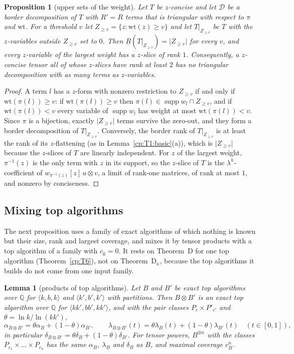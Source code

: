 \documentclass[11pt]{article}
\newtheorem{lemma}[theorem]{Lemma}
\newtheorem{proposition}[theorem]{Proposition}
\theoremstyle{definition}
\theoremstyle{remark}
\providecommand{\Q}{\mathbb{Q}}
\newcommand{\abs}[1]{\lvert #1\rvert}
\DeclareMathOperator{\supp}{supp}
\newcommand{\bR}{\underline{R}}               %
\newcommand{\mat}[3]{\langle #1,#2,#3\rangle} %
\newcommand{\cB}{c_B}                         %
\newcommand{\lamB}{\lambda_B}                 %
\newcommand{\delB}{\delta_B}                  %
\newcommand{\alB}{\alpha_B}                   %
\newcommand{\cg}{c_{\mathrm g}}               %
\newcommand{\ThmD}{Theorem~D}                               %
\newcommand{\ThmDk}{Theorem~D\texorpdfstring{\ensuremath{_\kappa}}{\_kappa}}     %
\newcommand{\wt}{\mathrm{wt}}                %
\begin{document}
\begin{proposition}[upper sets of the weight]\label{cp:C5}
Let $T$ be $z$-concise and let $\mathcal D$ be a border decomposition of $T$ with $R'=R$ terms that is triangular with respect to $\pi$ and $\wt$. For a threshold $v$ let $Z_{\ge v}=\{z:\wt(z)\ge v\}$ and let $T|_{Z_{\ge v}}$ be $T$ with the $z$-variables outside $Z_{\ge v}$ set to $0$. Then $\bR(T|_{Z_{\ge v}})=\abs{Z_{\ge v}}$ for every $v$, and every $z$-variable of the largest weight has a $z$-slice of rank $1$. Consequently, a $z$-concise tensor all of whose $z$-slices have rank at least $2$ has no triangular decomposition with as many terms as $z$-variables.
\end{proposition}

\begin{proof}
A term $l$ has a $z$-form with nonzero restriction to $Z_{\ge v}$ if and only if $\wt(\pi(l))\ge v$: if $\wt(\pi(l))\ge v$ then $\pi(l)\in\supp w_l\cap Z_{\ge v}$, and if $\wt(\pi(l))<v$ every variable of $\supp w_l$ has weight at most $\wt(\pi(l))<v$. Since $\pi$ is a bijection, exactly $\abs{Z_{\ge v}}$ terms survive the zero-out, and they form a border decomposition of $T|_{Z_{\ge v}}$. Conversely, the border rank of $T|_{Z_{\ge v}}$ is at least the rank of its $z$-flattening (as in Lemma~\ref{cp:T1:basic}(a)), which is $\abs{Z_{\ge v}}$ because the $z$-slices of $T$ are linearly independent. For $z$ of the largest weight, $\pi^{-1}(z)$ is the only term with $z$ in its support, so the $z$-slice of $T$ is the $\lambda^h$-coefficient of $w_{\pi^{-1}(z)}[z]\,u\otimes v$, a limit of rank-one matrices, of rank at most $1$, and nonzero by conciseness.
\end{proof}

\subsection{Mixing top algorithms}\label{cp:sec:tr:mix}

The next proposition uses a family of exact algorithms of which nothing is known but their size, rank and largest coverage, and mixes it by tensor products with a top algorithm of a family with $\cg=0$. It rests on \ThmD{} for one top algorithm (Theorem~\ref{cp:T6}), not on \ThmDk, because the top algorithms it builds do not come from one input family.

\begin{lemma}[products of top algorithms]\label{cp:C14:prod}
Let $B$ and $B'$ be exact top algorithms over $\Q$ for $\mat kbk$ and $\mat{k'}{b'}{k'}$ with partitions. Then $B\otimes B'$ is an exact top algorithm over $\Q$ for $\mat{kk'}{bb'}{kk'}$, and with the pair classes $P_c\times P'_{c'}$ and $\theta=\ln k/\ln(kk')$,
\[
\alpha_{B\otimes B'}=\theta\alB+(1-\theta)\alpha_{B'},\qquad\lambda_{B\otimes B'}(t)=\theta\lamB(t)+(1-\theta)\lambda_{B'}(t)\quad(t\in[0,1]),
\]
in particular $\delta_{B\otimes B'}=\theta\delB+(1-\theta)\delta_{B'}$. For tensor powers, $B^{\otimes n}$ with the classes $P_{c_1}\times\dots\times P_{c_n}$ has the same $\alB$, $\lamB$ and $\delB$ as $B$, and maximal coverage $\cB^n$.
\end{lemma}
\end{document}

